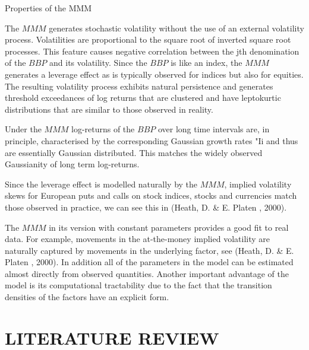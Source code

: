 \documentclass[unknownkeysallowed, compress]{beamer}
\theoremstyle{plain}
\begin{document}
\begin{frame}[allowframebreaks]{Properties of the MMM}
    \noindent
\par The $MMM$ generates stochastic volatility without the use of an external volatility
process. Volatilities are proportional to the square root of inverted square root
processes. This feature causes negative correlation between the jth denomination of the
$BBP$ and its volatility. Since the $BBP$ is like an index, the $MMM$ generates a leverage effect
as is typically observed for indices but also for equities. The resulting volatility process
exhibits natural persistence and generates threshold exceedances of log returns that are
clustered and have leptokurtic distributions that are similar to those observed in reality.\\
\par Under the $MMM$ log-returns of the $BBP$ over long time intervals are, in principle,
characterised by the corresponding Gaussian growth rates "Ii and thus are essentially
Gaussian distributed. This matches the widely observed Gaussianity of long term log-returns.\\
\par Since the leverage effect is modelled naturally by the $MMM$, implied volatility
skews for European puts and calls on stock indices, stocks and currencies match those
observed in practice, we can see this in (Heath, D. \& E. Platen , 2000).\\
\par The $MMM$ in its version with constant parameters provides a good fit to real data.
For example, movements in the at-the-money implied volatility are naturally captured by
movements in the underlying factor, see (Heath, D. \& E. Platen , 2000). In addition all of
the parameters in the model can be estimated almost directly from observed quantities.
Another important advantage of the model is its computational tractability due to the
fact that the transition densities of the factors have an explicit form.

\end{frame}
\section{LITERATURE REVIEW}
\end{document}
